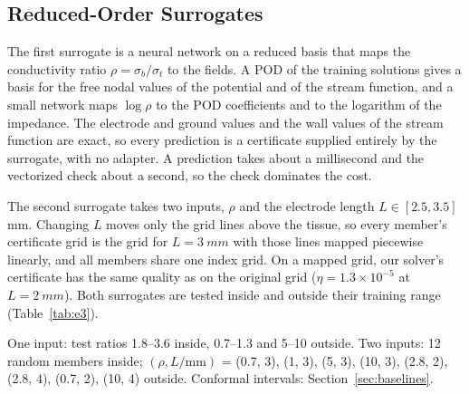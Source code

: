 \documentclass[11pt]{article}
\begin{document}
\subsection{Reduced-Order Surrogates}\label{sec:rom}
The first surrogate is a neural network on a reduced basis \cite{hesthaven2018}
that maps the conductivity ratio $\rho=\sigma_b/\sigma_t$ to the fields. A POD of
the training solutions gives a basis for the free nodal values of the potential and
of the stream function, and a small network maps $\log\rho$ to the POD coefficients
and to the logarithm of the impedance. The electrode and ground values and the wall
values of the stream function are exact, so every prediction is a certificate
supplied entirely by the surrogate, with no adapter. A prediction takes about a
millisecond and the vectorized check about a second, so the check dominates the
cost.

The second surrogate takes two inputs, $\rho$ and the electrode length
$L\in[2.5,3.5]$\,mm. Changing $L$ moves only the grid lines above the tissue, so every
member's certificate grid is the grid for $L=\SI{3}{mm}$ with those lines
mapped piecewise linearly, and all members share one index grid. On a mapped grid,
our solver's certificate has the same quality as on the original grid
($\eta=1.3\times10^{-5}$ at $L=\SI{2}{mm}$). Both surrogates are tested inside and
outside their training range (Table~\ref{tab:e3}).

\begin{table}[t]
\centering
\caption{Certifying Reduced-Order Surrogates per Prediction}\label{tab:e3}
\small
{}
\par\vspace{2pt}\footnotesize\raggedright One input: test ratios 1.8--3.6 inside, 0.7--1.3 and 5--10 outside. Two inputs: 12 random members inside; $(\rho, L/\mathrm{mm})$ = (0.7, 3), (1, 3), (5, 3), (10, 3), (2.8, 2), (2.8, 4), (0.7, 2), (10, 4) outside. Conformal intervals: Section~\ref{sec:baselines}.
\end{table}
\end{document}
